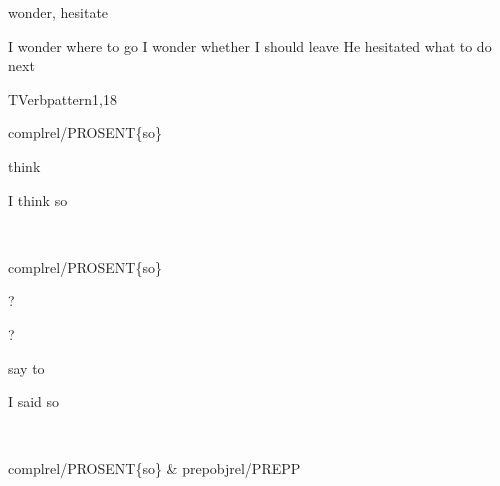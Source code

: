 
\begin{thetadescr}
\evitem wonder, hesitate
\esitem
     \begin{examples}
        \example I wonder where to go
        \example I wonder whether I should leave
        \example He hesitated what to do next
     \end{examples}
\end{thetadescr}


\newpage
\verbpattern{[synSOPROSENT]}
\begin{vpattern}
 TVerbpattern1,18
\csritem \mbox{}\\
     \begin{csr}
       complrel/PROSENT\{so\}
     \end{csr}
\remarksitem
\end{vpattern}



\begin{thetadescr}
\evitem think
\esitem
     \begin{examples}
        \example I think so
     \end{examples}
\end{thetadescr}


\newpage
{}
\begin{vpattern}
 \norule
\csritem \mbox{}\\
     \begin{csr}
       complrel/PROSENT\{so\}
     \end{csr}
\remarksitem
\end{vpattern}


\begin{thetadescr}
\evitem ?
\esitem
     \begin{examples}
        \example  ?
     \end{examples}
\end{thetadescr}



\begin{thetadescr}
\evitem say to
\esitem
     \begin{examples}
        \example I said so
     \end{examples}
\end{thetadescr}


\newpage
{}
\begin{vpattern}
 \norule
\csritem \mbox{}\\
     \begin{csr}
       complrel/PROSENT\{so\} & prepobjrel/PREPP
     \end{csr}
\remarksitem
\end{vpattern}

